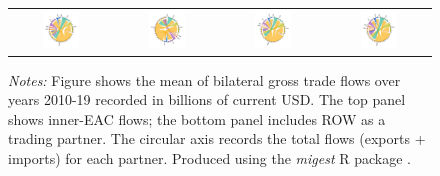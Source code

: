 \documentclass[a4paper]{article}
\begin{document}
\begin{figure}[h!]
{\begin{tabular}{cccc}
\includegraphics[width=0.4\textwidth, trim= {0.85cm 0.8cm 1cm 1cm}, clip]{"Figures/BACI_MIG_2010_19_ROW.pdf"} & \includegraphics[width=0.4\textwidth, trim= {0.8cm 0.8cm 1cm 1cm}, clip]{"Figures/DOT_MIG_2010_19_ROW.pdf"} &
\includegraphics[width=0.4\textwidth, trim= {1cm 0.8cm 0.9cm 1cm}, clip]{"Figures/EORA_MIG_2010_19_ROW.pdf"} &
\includegraphics[width=0.4\textwidth, trim= {0.8cm 0.8cm 1cm 1cm}, clip]{"Figures/EM_MIG_2010_19_ROW.pdf"}
\end{tabular}
}
\raggedright
\scriptsize 
\emph{Notes:} Figure shows the mean of bilateral gross trade flows over years 2010-19 recorded in billions of current USD. The top panel shows inner-EAC flows; the bottom panel includes ROW as a trading partner. The circular axis records the total flows (exports + imports) for each partner. Produced using the \emph{migest} R package \citep{rmigest}.
\end{figure}
\FloatBarrier
\end{document}
